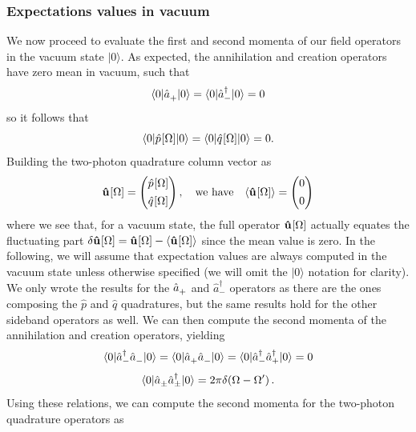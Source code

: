 \subsubsection*{Expectations values in vacuum}
We now proceed to evaluate the first and second momenta of our field operators in the vacuum state $|0\rangle$. As expected, the annihilation and creation operators have zero mean in vacuum, such that
\[\langle 0 | \hat{a}^{\vphantom{\dagger}}_{+} | 0 \rangle = \langle 0 | \hat{a}^\dagger_{-} | 0 \rangle = 0\]
so it follows that
\[\langle 0 | \hat{p}^{\vphantom{\dagger}}[\Omega] | 0 \rangle = \langle 0 | \hat{q}^{\vphantom{\dagger}}[\Omega] | 0 \rangle = 0. \]
Building the two-photon quadrature column vector as
\[\mathbf{\hat{u}}^{\vphantom{\dagger}}[\Omega] = \begin{pmatrix}
\hat{p}^{\vphantom{\dagger}}[\Omega] \\[4pt]
\hat{q}^{\vphantom{\dagger}}[\Omega] \\
\end{pmatrix}, \quad \text{we have} \quad \langle\mathbf{\hat{u}}^{\vphantom{\dagger}}[\Omega]\rangle = \begin{pmatrix}
0 \\[4pt]
0 \\
\end{pmatrix}\]
where we see that, for a vacuum state, the full operator $\mathbf{\hat{u}}^{\vphantom{\dagger}}[\Omega]$ actually equates the fluctuating part $\delta \mathbf{\hat{u}}^{\vphantom{\dagger}}[\Omega] = \mathbf{\hat{u}}^{\vphantom{\dagger}}[\Omega] - \langle \mathbf{\hat{u}}^{\vphantom{\dagger}}[\Omega] \rangle$ since the mean value is zero. In the following, we will assume that expectation values are always computed in the vacuum state unless otherwise specified (we will omit the $|0\rangle$ notation for clarity). 
We only wrote the results for the $\hat a^{\vphantom{\dagger}}_+$ and $\hat a_-^\dagger$ operators as there are the ones composing the $\hat p$ and $\hat q$ quadratures, but the same results hold for the other sideband operators as well.
We can then compute the second momenta of the annihilation and creation operators, yielding
\[\langle 0 | \hat{a}^{\dagger}_{-} \hat{a}^{\vphantom{\dagger}}_{-} | 0 \rangle = \langle 0 | \hat{a}^{\vphantom{\dagger}}_{+} \hat{a}^{\vphantom{\dagger}}_{-} | 0 \rangle = \langle 0 | \hat{a}^{\dagger}_{-} \hat{a}^{\dagger}_{+} | 0 \rangle = 0 \]
\[ \langle 0 | \hat{a}^{\vphantom{\dagger}}_{\pm} \hat{a}^{\dagger}_{\pm} | 0 \rangle = 2 \pi \delta(\Omega - \Omega') \,.\]
Using these relations, we can compute the second momenta for the two-photon quadrature operators as 
